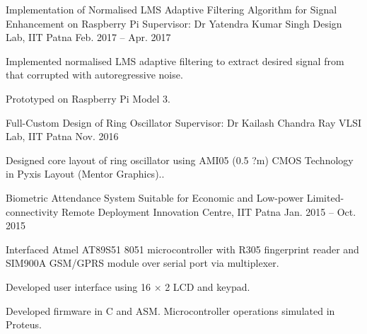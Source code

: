 
\begin{cvprojects}

\cvproject
	{Implementation of Normalised LMS Adaptive Filtering Algorithm for Signal Enhancement on Raspberry Pi} %
	{Supervisor: Dr Yatendra Kumar Singh} %
	{Design Lab, IIT Patna} %
	{Feb. 2017 -- Apr. 2017} %
	{\begin{cvitems} %
		\item {Implemented normalised LMS adaptive filtering to extract desired signal from that corrupted with autoregressive noise.}
		\item {Prototyped on Raspberry Pi Model 3.}
	\end{cvitems}}

\cvproject
	{Full-Custom Design of Ring Oscillator} %
	{Supervisor: Dr Kailash Chandra Ray} %
	{VLSI Lab, IIT Patna} %
	{Nov. 2016} %
	{\begin{cvitems} %
		\item {Designed core layout of ring oscillator using AMI05 (0.5 ?m) CMOS Technology in Pyxis Layout (Mentor Graphics)..}
	\end{cvitems}}

\cvproject
	{Biometric Attendance System Suitable for Economic and Low-power Limited-connectivity Remote Deployment} %
	{} %
	{Innovation Centre, IIT Patna} %
	{Jan. 2015 -- Oct. 2015} %
	{\begin{cvitems} %
		\item {Interfaced Atmel AT89S51 8051 microcontroller with R305 fingerprint reader and SIM900A GSM/GPRS module over serial port via multiplexer.}
		\item {Developed user interface using 16 $\times$ 2 LCD and keypad.}
		\item {Developed firmware in C and ASM. Microcontroller operations simulated in Proteus.}
	\end{cvitems}}

\end{cvprojects}
